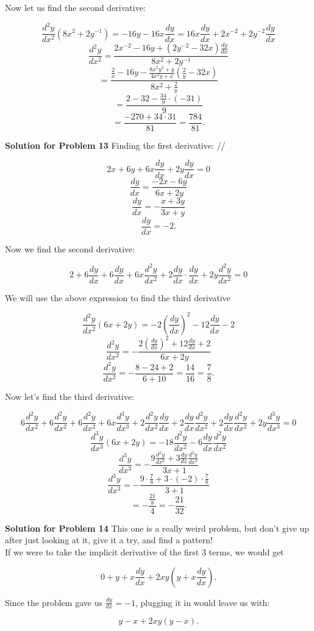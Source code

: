 \documentclass{article}
\newcommand \der {\frac {dy} {dx}}
\newcommand \ders {\left( \frac {dy} {dx} \right)^{2}}
\newcommand \derr {\frac {d^{2}y} {dx^2}}
\newcommand \derrr {\frac {d^{3}y} {dx^3}}
\begin{document}
Now let us find the second derivative:

\[\derr \left( 8x^2 + 2y^{-1} \right) = -16y - 16x\der = 16x\der + 2x^{-2} + 2y^{-2}\der\]
\[\derr = \dfrac {2x^{-2} - 16y + \left( 2y^{-2} - 32x \right)\der} {8x^2 + 2y^{-1}}\]
\[= \dfrac {\frac {2} {x} - 16y -\frac {8x^2y^2 + y} {4x^2y + x}\left( \frac {2} {y} - 32x \right)} {8x^2 + \frac {2} {y}}\]
\[= \dfrac {2 - 32 - \frac {34} {9} \cdot (-31)} {9}\]
\[ = \frac {-270 + 34 \cdot 31} {81} = \boxed{\frac {784} {81}}.\]

\vspace{1cm}

\textbf{Solution for Problem 13} Finding the first derivative: //

\[2x + 6y + 6x\der + 2y\der = 0\]
\[\der = \frac {-2x - 6y} {6x + 2y}\]
\[\der = -\frac {x + 3y} {3x + y}\]
\[\der = -2.\]

Now we find the second derivative:

\[2 + 6\der + 6\der + 6x\derr + 2\der \cdot \der + 2y \derr = 0\]

We will use the above expression to find the third derivative

\[\derr \left( 6x + 2y \right) = -2\ders - 12\der - 2\]
\[\derr = -\dfrac {2\ders + 12\der + 2} {6x + 2y}\]
\[\derr = -\frac {8 - 24 + 2} {6 + 10} = \frac {14} {16} = \frac {7} {8}.\]

Now let's find the third derivative:

\[6\derr + 6\derr + 6\derr + 6x\derrr + 2\derr \der + 2\der \derr + 2\der \derr + 2y \derrr = 0\]
\[\derrr \left( 6x + 2y \right) = -18\derr - 6\der \derr\]\[\derrr = -\dfrac {9\derr + 3\der \derr} {3x + 1}\]
\[\derrr = -\frac {9 \cdot \frac {7} {8} + 3 \cdot (-2) \cdot \frac {7} {8}} {3 + 1}\]
\[= -\frac {\frac {21} {8}} {4} = \boxed{-\frac {21} {32}}.\]

\vspace{1cm}


\textbf{Solution for Problem 14} This one is a really weird problem, but don't give up after just looking at it, give it a try, and find a pattern!\\

If we were to take the implicit derivative of the first 3 terms, we would get

\[0 + y + x\der + 2xy \left( y + x\der \right).\]

Since the problem gave us $\der = -1$, plugging it in would leave us with:

\[y - x + 2xy\left( y - x \right).\]
\end{document}
